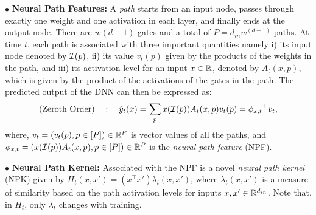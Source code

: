 \documentclass{article}
\begin{document}
$\bullet$ \textbf{Neural Path Features:}  A \emph{path} starts from an input node, passes through exactly one weight and one activation in each layer, and finally ends at the output node. There are $w(d-1)$ gates and a total of $P=d_{in}w^{(d-1)}$ paths. At time $t$, each path is associated with three important quantities namely i) its input node denoted by $\mathcal{I}(p)$, ii) its value $v_t(p)$ given by the products of the weights in the path, and  iii) its activation level for an input $x\in\mathbb{R}$, denoted by $A_t(x,p)$, which is given by the product of the activations of the gates in the path. The predicted output of the DNN can then be expressed as:
\begin{align}\label{eq:npf}
\text{(Zeroth Order)}\quad: \quad \hat{y}_t(x)=\sum_{p}x(\mathcal{I}(p))A_t(x,p)v_t(p)={\phi_{x,t}}^\top v_t, 
\end{align}
where, $v_t=(v_t(p),p\in[P])\in \mathbb{R}^P$ is vector values of all the paths, and  $\phi_{x,t}=\left( x(\mathcal{I}(p))A_t(x,p),p\in[P]\right)\in \mathbb{R}^P$ is the \emph{neural path feature} (NPF).

$\bullet$ \textbf{Neural Path Kernel:} Associated with the NPF is a novel \emph{neural path kernel} (NPK) given by  $H_t(x,x')=(x^\top x')\lambda_t(x,x')$, where $\lambda_t(x,x')$ is a measure of similarity based on the path activation levels for inputs $x,x'\in\mathbb{R}^{d_{in}}$. %
Note that, in $H_t$, only $\lambda_t$ changes with training. 
\end{document}
